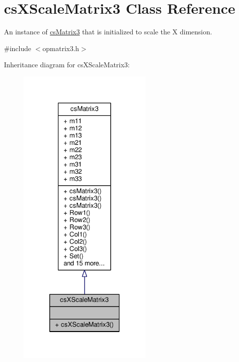 \hypertarget{classcsXScaleMatrix3}{}\section{cs\+X\+Scale\+Matrix3 Class Reference}
\label{classcsXScaleMatrix3}


An instance of \hyperlink{classcsMatrix3}{cs\+Matrix3} that is initialized to scale the X dimension.  




{\ttfamily \#include $<$opmatrix3.\+h$>$}



Inheritance diagram for cs\+X\+Scale\+Matrix3\+:
\nopagebreak
\begin{figure}[H]
\begin{center}
\leavevmode
\includegraphics[width=186pt]{d2/df9/classcsXScaleMatrix3__inherit__graph}
\end{center}
\end{figure}


